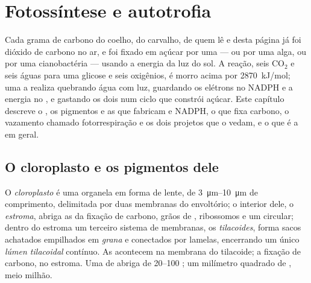 \chapter{Fotossíntese e autotrofia}\label{ch:b1:photosynthesis}

Cada grama de carbono do coelho, do carvalho, de quem lê e desta página
já foi dióxido de carbono no ar, e foi fixado em açúcar por uma 
--- ou por uma alga, ou por uma cianobactéria --- usando a energia da
luz do sol. A reação, seis $\mathrm{CO_2}$ e seis águas para uma glicose
e seis oxigênios, é morro acima por \qty{2870}{kJ/mol}; uma  a
realiza quebrando água com luz, guardando os elétrons no NADPH e a
energia no , e gastando os dois num ciclo que constrói açúcar. Este
capítulo descreve o , os pigmentos e as  que
fabricam  e NADPH, o  que fixa carbono, o vazamento
chamado fotorrespiração e os dois projetos que o vedam, e o que é a
 em geral.

\section{O cloroplasto e os pigmentos dele}

\begin{definition}[Cloroplasto]\label{def:b1:photosynthesis:chloroplast}
O \emph{cloroplasto} é uma organela em forma de
lente, de \qtyrange{3}{10}{\micro m} de comprimento, delimitada por duas
membranas do envoltório; o interior dele, o \emph{estroma},
abriga as  da fixação de carbono, grãos de , ribossomos e um
 circular; dentro do estroma um terceiro sistema de membranas, os
\emph{tilacoides}, forma sacos achatados empilhados em
\emph{grana} e conectados por lamelas, encerrando um único
\emph{lúmen tilacoidal} contínuo. As  acontecem na
membrana do tilacoide; a fixação de carbono, no estroma. Uma  de
 abriga de \qtyrange{20}{100}{} ; um milímetro quadrado
de , meio milhão.
\end{definition}

